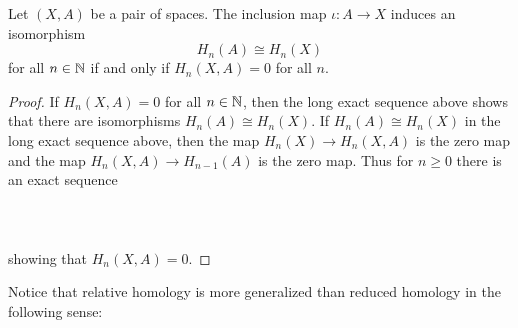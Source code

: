 \documentclass[a4paper]{article}
\begin{document}
\begin{lmm}{}{} Let $(X,A)$ be a pair of spaces. The inclusion map $\iota:A\to X$ induces an isomorphism $$H_n(A)\cong H_n(X)$$ for all $n\in\mathbb{N}$ if and only if $H_n(X,A)=0$ for all $n$. \tcbline
\begin{proof}
If $H_n(X,A)=0$ for all $n\in\mathbb{N}$, then the long exact sequence above shows that there are isomorphisms $H_n(A)\cong H_n(X)$. If $H_n(A)\cong H_n(X)$ in the long exact sequence above, then the map $H_n(X)\to H_n(X,A)$ is the zero map and the map $H_n(X,A)\to H_{n-1}(A)$ is the zero map. Thus for $n\geq 0$ there is an exact sequence \\~\\
\\~\\
showing that $H_n(X,A)=0$. 
\end{proof}
\end{lmm}

Notice that relative homology is more generalized than reduced homology in the following sense: 
\end{document}
